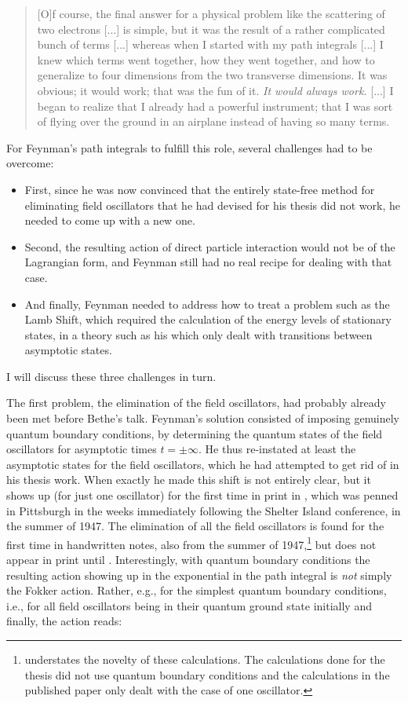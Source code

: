\documentclass[12pt,a4paper]{article}
\begin{document}
\begin{quote}
[O]f course, the final answer for a physical problem like the scattering of two electrons [...] is simple, but it was the result of a rather complicated bunch of terms  [...] whereas when I started with my path integrals [...] I knew which terms went together, how they went together, and how to generalize to four dimensions from the two transverse dimensions. It was obvious; it would work; that was the fun of it. \emph{It would always work.} [...] I began to realize that I already had a powerful instrument; that I was sort of flying over the ground in an airplane instead of having so many terms.
\end{quote}

For Feynman's path integrals to fulfill this role, several challenges had to be overcome:

\begin{itemize}
\item First, since he was now convinced that the entirely state-free method for eliminating field oscillators that he had devised for his thesis did not work, he needed to come up with a new one. 
\item Second, the resulting action of direct particle interaction would not be of the Lagrangian form, and Feynman still had no real recipe for dealing with that case. 
\item And finally, Feynman needed to address how to treat a problem such as the Lamb Shift, which required the calculation of the energy levels of stationary states, in a theory such as his which only dealt with transitions between asymptotic states.
\end{itemize}

I will discuss these three challenges in turn.

The first problem, the elimination of the field oscillators, had probably already been met before Bethe's talk. Feynman's solution consisted of imposing genuinely quantum boundary conditions, by determining the quantum states of the field oscillators for asymptotic times $t=\pm \infty$. He thus re-instated at least the asymptotic states for the field oscillators, which he had attempted to get rid of in his thesis work. When exactly he made this shift is not entirely clear, but it shows up (for just one oscillator) for the first time in print in \citep{feynman_1948_space-time}, which was penned in Pittsburgh in the weeks immediately following the Shelter Island conference, in the summer of 1947. The elimination of all the field oscillators is found for the first time in handwritten notes, also from the summer of 1947,\footnote{\citep[p. 479]{schweber_1986_feynman} understates the novelty of these calculations. The calculations done for the thesis did not use quantum boundary conditions and the calculations in the published paper only dealt with the case of one oscillator.} but does not appear in print until \citep{feynman_1950_mathematical}. Interestingly, with quantum boundary conditions the resulting action showing up in the exponential in the path integral is \emph{not} simply the Fokker action. Rather, e.g., for the simplest quantum boundary conditions, i.e., for all field oscillators being in their quantum ground state initially and finally, the action reads:
\end{document}
